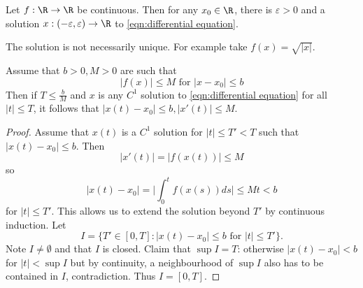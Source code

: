 \documentclass[a4paper]{article}
\begin{document}
\begin{theorem}
  \label{thm:Peano existence theorem}
  Let \(f: \R \to \R\) be continuous. Then for any \(x_0 \in \R\), there is \(\varepsilon > 0\) and a solution \(x: (-\varepsilon, \varepsilon) \to \R\) to \eqref{eqn:differential equation}.
\end{theorem}

\begin{remark}
  The solution is not necessarily unique. For example take \(f(x) = \sqrt{|x|}\).
\end{remark}

\begin{lemma}
  Assume that \(b > 0, M > 0\) are such that
  \[
    \label{eqn:2}
    |f(x)| \leq M \text{ for } |x - x_0| \leq b
    \tag{\dagger}
  \]
   Then if \(T \leq \frac{b}{M}\) and \(x\) is any \(C^1\) solution to \eqref{eqn:differential equation} for all \(|t| \leq T\), it follows that \(|x(t) - x_0| \leq b, |x'(t)| \leq M\).
\end{lemma}

\begin{proof}
  Assume that \(x(t)\) is a \(C^1\) solution for \(|t| \leq T' < T\) such that \(|x(t) - x_0| \leq b\). Then
  \[
    |x'(t)| = |f(x(t))| \leq M
  \]
  so
  \[
    |x(t) - x_0| = \Bigg| \int_0^t f(x(s)) ds \Bigg| \leq Mt < b
  \]
  for \(|t| \leq T'\). This allows us to extend the solution beyond \(T'\) by continuous induction. Let
  \[
    I = \{T' \in [0, T]: |x(t) - x_0| \leq b \text{ for } |t| \leq T'\}.
  \]
  Note \(I \neq \emptyset\) and that \(I\) is closed. Claim that \(\sup I = T\): otherwise \(|x(t) - x_0| < b\) for \(|t| < \sup I\) but by continuity, a neighbourhood of \(\sup I\) also has to be contained in \(I\), contradiction. Thus \(I = [0, T]\).
\end{proof}
\end{document}
